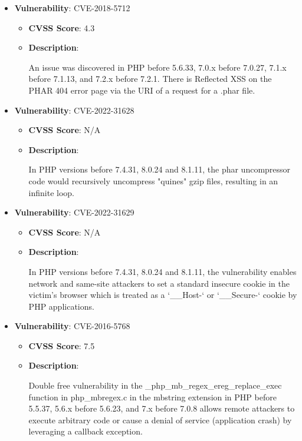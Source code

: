 \documentclass{article}
\begin{document}
\begin{itemize}
        \item \textbf{Vulnerability}: CVE-2018-5712
        \begin{itemize}
            \item \textbf{CVSS Score}:  4.3 
            \item \textbf{Description}:
            \parbox[t]{0.9\linewidth}{
                \ttfamily An issue was discovered in PHP before 5.6.33, 7.0.x before 7.0.27, 7.1.x before 7.1.13, and 7.2.x before 7.2.1. There is Reflected XSS on the PHAR 404 error page via the URI of a request for a .phar file.
            }
        \end{itemize}
    
        \item \textbf{Vulnerability}: CVE-2022-31628
        \begin{itemize}
            \item \textbf{CVSS Score}:  N/A 
            \item \textbf{Description}:
            \parbox[t]{0.9\linewidth}{
                \ttfamily In PHP versions before 7.4.31, 8.0.24 and 8.1.11, the phar uncompressor code would recursively uncompress "quines" gzip files, resulting in an infinite loop.
            }
        \end{itemize}
    
        \item \textbf{Vulnerability}: CVE-2022-31629
        \begin{itemize}
            \item \textbf{CVSS Score}:  N/A 
            \item \textbf{Description}:
            \parbox[t]{0.9\linewidth}{
                \ttfamily In PHP versions before 7.4.31, 8.0.24 and 8.1.11, the vulnerability enables network and same-site attackers to set a standard insecure cookie in the victim's browser which is treated as a `\_\_Host-` or `\_\_Secure-` cookie by PHP applications.
            }
        \end{itemize}
    
        \item \textbf{Vulnerability}: CVE-2016-5768
        \begin{itemize}
            \item \textbf{CVSS Score}:  7.5 
            \item \textbf{Description}:
            \parbox[t]{0.9\linewidth}{
                \ttfamily Double free vulnerability in the \_php\_mb\_regex\_ereg\_replace\_exec function in php\_mbregex.c in the mbstring extension in PHP before 5.5.37, 5.6.x before 5.6.23, and 7.x before 7.0.8 allows remote attackers to execute arbitrary code or cause a denial of service (application crash) by leveraging a callback exception.
            }
        \end{itemize}
    

\end{itemize}
\end{document}
